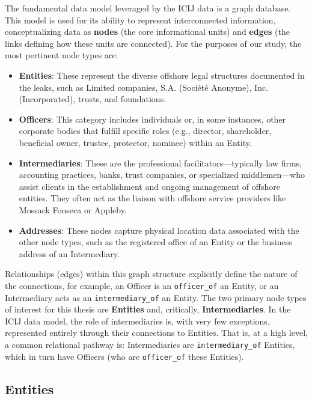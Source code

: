 The fundamental data model leveraged by the ICIJ data is a graph database. This model is used for its ability to represent interconnected information, conceptualizing data as \textbf{nodes} (the core informational units) and \textbf{edges} (the links defining how these units are connected). For the purposes of our study, the most pertinent node types are:
\begin{itemize}
    \item \textbf{Entities}: These represent the diverse offshore legal structures documented in the leaks, such as Limited companies, S.A. (Société Anonyme), Inc. (Incorporated), trusts, and foundations.
    \item \textbf{Officers}: This category includes individuals or, in some instances, other corporate bodies that fulfill specific roles (e.g., director, shareholder, beneficial owner, trustee, protector, nominee) within an Entity.
    \item \textbf{Intermediaries}: These are the professional facilitators—typically law firms, accounting practices, banks, trust companies, or specialized middlemen—who assist clients in the establishment and ongoing management of offshore entities. They often act as the liaison with offshore service providers like Mossack Fonseca or Appleby.
    \item \textbf{Addresses}: These nodes capture physical location data associated with the other node types, such as the registered office of an Entity or the business address of an Intermediary.
\end{itemize}

Relationships (edges) within this graph structure explicitly define the nature of the connections, for example, an Officer is an \texttt{officer\_of} an Entity, or an Intermediary acts as an \texttt{intermediary\_of} an Entity. The two primary node types of interest for this thesis are \textbf{Entities} and, critically, \textbf{Intermediaries}. In the ICIJ data model, the role of intermediaries is, with very few exceptions, represented entirely through their connections to Entities. That is, at a high level, a common relational pathway is: Intermediaries are \texttt{intermediary\_of} Entities, which in turn have Officers (who are \texttt{officer\_of} these Entities).

\subsection{Entities}

